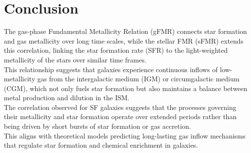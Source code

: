 \documentclass[svgnames]{article}     %
\begin{document}
\section{Conclusion}

The gas-phase Fundamental Metallicity Relation (gFMR) connects star formation
and gas metallicity over long time scales, while the stellar FMR (sFMR) extends
this correlation, linking the star formation rate (SFR) to the light-weighted
metallicity of the stars over similar time frames.\\

This relationship suggests that galaxies experience continuous inflows of
low-metallicity gas from the intergalactic medium (IGM) or circumgalactic
medium (CGM), which not only fuels star formation but also maintains a balance
between metal production and dilution in the ISM.\\

The correlation observed for SF galaxies suggests that the processes governing
their metallicity and star formation operate over extended periods rather than
being driven by short bursts of star formation or gas accretion. \\

This aligns with theoretical models predicting long-lasting gas inflow
mechanisms that regulate star formation and chemical enrichment in galaxies.
\end{document}

